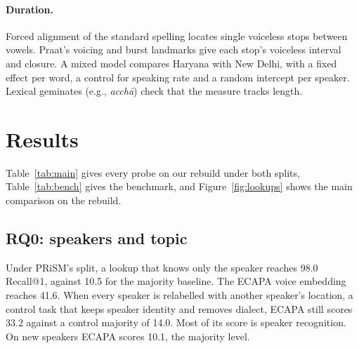 \documentclass[11pt]{article}
\begin{document}
\paragraph{Duration.} Forced alignment of the standard spelling \citep{pratap2024mms} locates single voiceless
stops between vowels. Praat's voicing and burst landmarks give each stop's voiceless interval and closure. A
mixed model compares Haryana with New Delhi, with a fixed effect per word, a control for speaking rate and a
random intercept per speaker. Lexical geminates (e.g., \textit{acch\=a}) check that the measure tracks length.

\begin{table}[t]
\centering\small

\caption{Test Recall@1 (mean $\pm$ sd over seeds) and mean error in km of the seed ensemble on our rebuild.
The picture-ID lookup has no km value because it predicts a pincode, not a point.}
\label{tab:main}
\end{table}

\begin{table}[t]
\centering\footnotesize

\caption{The benchmark: every speaker group tested once, by a model that never saw it. Recall@1 of the pooled
out-of-fold predictions, its lift over the majority location with a 95\% confidence interval over speaker groups,
and the km saved against the best constant location. Shared pictures carry no information about the location.}
\label{tab:bench}
\end{table}

\section{Results}
\label{sec:results}
Table~\ref{tab:main} gives every probe on our rebuild under both splits, Table~\ref{tab:bench} gives the
benchmark, and Figure~\ref{fig:lookups} shows the main comparison on the rebuild.

\subsection{RQ0: speakers and topic}
Under PRiSM's split, a lookup that knows only the speaker reaches 98.0 Recall@1, against 10.5 for the majority
baseline. The ECAPA voice embedding reaches 41.6. When every speaker is relabelled with another speaker's
location, a control task that keeps speaker identity and removes dialect, ECAPA still scores 33.2 against a
control majority of 14.0. Most of its score is speaker recognition. On new speakers ECAPA scores 10.1, the
majority level.
\end{document}

